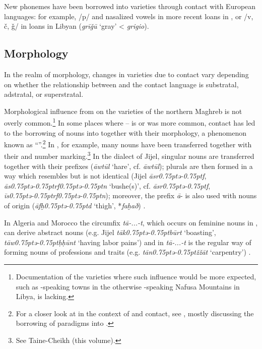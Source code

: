 \documentclass[output=paper]{langsci/langscibook}
\begin{document}
  New phonemes have been borrowed into  varieties through contact with European languages: for example, /p/ and nasalized vowels in more recent  loans in  , or /v, č, ǧ/ in  loans in Libyan  (\textit{grīǧū} ‘gray’ < \textit{grigio}).

  \subsection{Morphology}\label{Morphology}

In the realm of morphology, changes in  varieties due to contact vary depending on whether the relationship between  and the contact language is substratal, adstratal, or superstratal.

  Morphological influence from  on the  varieties of the northern Maghreb is not overly common.\footnote{Documentation of the varieties where such influence would be more expected, such as -speaking towns in the otherwise -speaking Nafusa Mountains in Libya, is lacking.} In some places where --  is or was more common, contact has led to the borrowing of  nouns into  together with their morphology, a phenomenon known as “”.\footnote{For a closer look at  in the context of  and  contact, see \citet{Kossmann2010}, mostly discussing the borrowing of  paradigms into .} In , for example, many nouns have been transferred together with their  and number marking.\footnote{See Taine-Cheikh (this volume).} In the dialect of Jijel,  singular nouns are transferred together with their prefixes (\textit{āwtūl} ‘hare’, cf.  \textit{āwtūl}); plurals are then formed in a way which resembles  but is not identical (Jijel \textit{āsr\kern 0.75ptǝ\kern -0.75ptf}, \textit{ās\kern 0.75ptǝ\kern -0.75ptrf\kern 0.75ptǝ\kern -0.75ptn} ‘bushe(s)’, cf.   \textit{āsr\kern 0.75ptǝ\kern -0.75ptf}, \textit{īs\kern 0.75ptǝ\kern -0.75ptrf\kern 0.75ptǝ\kern -0.75ptn}); moreover, the prefix \textit{ā}{}- is also used with nouns of  origin (\textit{āfḫ\kern 0.75ptǝ\kern -0.75ptd} ‘thigh’,  *\textit{faḫað}) \citep[302–318]{Marçais1956}.

  In Algeria and Morocco the circumfix \textit{tā-...-t}, which occurs on feminine nouns in , can derive abstract nouns (e.g. Jijel \textit{tāk\kern 0.75ptǝ\kern -0.75ptbūrt} ‘boasting’, \textit{tāw\kern 0.75ptǝ\kern -0.75ptḥḥūnt} ‘having labor pains’) and in   \textit{tā-...-t} is the regular way of forming nouns of professions and traits (e.g. \textit{tān\kern 0.75ptǝ\kern -0.75ptžžā{\R}t} ‘carpentry’) \citep{Kossmann2013chapter}.
\end{document}
